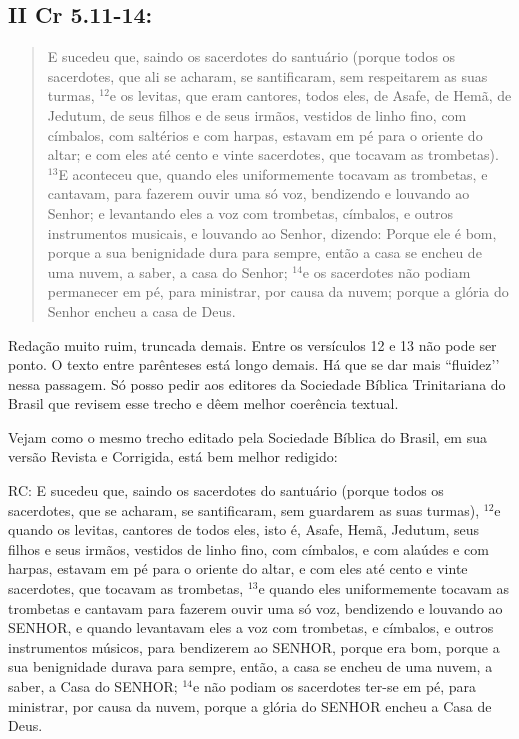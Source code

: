 \subsection*{II Cr 5.11-14:} 
\begin{quote}
    \small
E sucedeu que, saindo os sacerdotes do santuário (porque todos os sacerdotes, que ali se acharam, se santificaram, sem respeitarem as suas turmas, $^{\mathrm{12}}$e os levitas, que eram cantores, todos eles, de Asafe, de Hemã, de Jedutum, de seus filhos e de seus irmãos, vestidos de linho fino, com címbalos, com saltérios e com harpas, estavam em pé para o oriente do altar; e com eles até cento e vinte sacerdotes, que tocavam as trombetas). $^{\mathrm{13}}$E aconteceu que, quando eles uniformemente tocavam as trombetas, e cantavam, para fazerem ouvir uma só voz, bendizendo e louvando ao Senhor; e levantando eles a voz com trombetas, címbalos, e outros instrumentos musicais, e louvando ao Senhor, dizendo: Porque ele é bom, porque a sua benignidade dura para sempre, então a casa se encheu de uma nuvem, a saber, a casa do Senhor; $^{\mathrm{14}}$e os sacerdotes não podiam permanecer em pé, para ministrar, por causa da nuvem; porque a glória do Senhor encheu a casa de Deus.
\end{quote}

Redação muito ruim, truncada demais. Entre os versículos 12 e 13
não pode ser ponto. O texto entre parênteses está longo demais. Há que
se dar mais ``fluidez’’ nessa passagem. Só posso pedir aos editores
da Sociedade Bíblica Trinitariana do Brasil que revisem esse trecho e
dêem melhor coerência textual.

Vejam como o mesmo trecho editado pela Sociedade Bíblica
do Brasil, em sua versão Revista e Corrigida, está bem melhor redigido:

RC: E sucedeu que, saindo os sacerdotes do santuário (porque todos os
sacerdotes, que se acharam, se santificaram, sem guardarem as suas
turmas), $^{\mathrm{12}}$e quando os levitas, cantores de todos eles,
isto é, Asafe, Hemã, Jedutum, seus filhos e seus irmãos, vestidos de
linho fino, com címbalos, e com alaúdes e com harpas, estavam em pé
para o oriente do altar, e com eles até cento e vinte sacerdotes, que
tocavam as trombetas, $^{\mathrm{13}}$e quando eles uniformemente
tocavam as trombetas e cantavam para fazerem ouvir uma só voz,
bendizendo e louvando ao SENHOR, e quando levantavam eles a voz com
trombetas, e címbalos, e outros instrumentos músicos, para bendizerem
ao SENHOR, porque era bom, porque a sua benignidade durava para
sempre, então, a casa se encheu de uma nuvem, a saber, a Casa do
SENHOR; $^{\mathrm{14}}$e não podiam os sacerdotes ter-se em pé, para
ministrar, por causa da nuvem, porque a glória do SENHOR encheu a Casa
de Deus.


